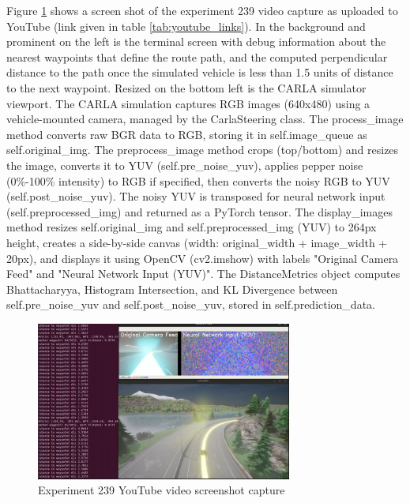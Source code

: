 Figure \ref{fig:Exp239-30pc-noise-CNN-5-bin-bal-youtube.png} shows a screen shot of the experiment 239 video capture as uploaded to YouTube (link given in table \ref{tab:youtube_links}). In the background and prominent on the left is the terminal screen with debug information about the nearest waypoints that define the route path, and the computed perpendicular distance to the path once the simulated vehicle is less than 1.5 units of distance to the next waypoint.
Resized on the bottom left is the CARLA simulator viewport.
The CARLA simulation captures RGB images (640x480) using a vehicle-mounted camera, managed by the CarlaSteering class. The process\_image method converts raw BGR data to RGB, storing it in self.image\_queue as self.original\_img. The preprocess\_image method crops (top/bottom) and resizes the image, converts it to YUV (self.pre\_noise\_yuv), applies pepper noise (0\%-100\% intensity) to RGB if specified, then converts the noisy RGB to YUV (self.post\_noise\_yuv). The noisy YUV is transposed for neural network input (self.preprocessed\_img) and returned as a PyTorch tensor. The display\_images method resizes self.original\_img and self.preprocessed\_img (YUV) to 264px height, creates a side-by-side canvas (width: original\_width + image\_width + 20px), and displays it using OpenCV (cv2.imshow) with labels "Original Camera Feed" and "Neural Network Input (YUV)". The DistanceMetrics object computes Bhattacharyya, Histogram Intersection, and KL Divergence between self.pre\_noise\_yuv and self.post\_noise\_yuv, stored in self.prediction\_data.



\begin{figure}[h]
    \centering
    \includegraphics[width=0.75\textwidth]{Figures/Results/Exp239-30pc-noise-CNN-5-bin-bal-youtube.png}
    \caption{Experiment 239 YouTube video screenshot capture}
    \label{fig:Exp239-30pc-noise-CNN-5-bin-bal-youtube.png}
\end{figure}






